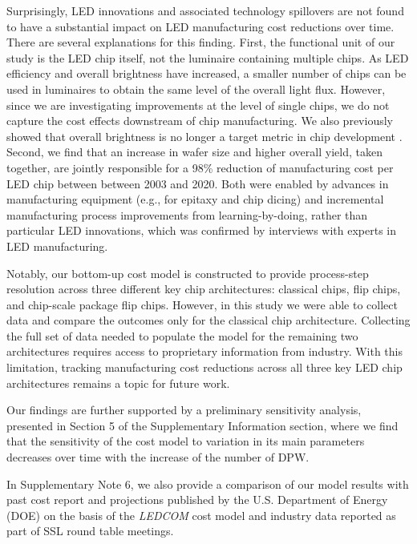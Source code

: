 \documentclass[parskip=full]{article}
\begin{document}
Surprisingly, LED innovations and associated technology spillovers are not found to have a substantial impact on LED manufacturing cost reductions over time. There are several explanations for this finding. First, the functional unit of our study is the LED chip itself, not the luminaire containing multiple chips. As LED efficiency and overall brightness have increased, a smaller number of chips can be used in luminaires to obtain the same level of the overall light flux. However, since we are investigating improvements at the level of single chips, we do not capture the cost effects downstream of chip manufacturing. We also previously showed that overall brightness is no longer a target metric in chip development \cite{weinold2021compound}. Second, we find that an increase in wafer size and higher overall yield, taken together, are jointly responsible for a 98\% reduction of manufacturing cost per LED chip between between 2003 and 2020. Both were enabled by advances in manufacturing equipment (e.g., for epitaxy and chip dicing) and incremental manufacturing process improvements from learning-by-doing, rather than particular LED innovations, which was confirmed by interviews with experts in LED manufacturing. 

Notably, our bottom-up cost model is constructed to provide process-step resolution across three different key chip architectures: classical chips, flip chips, and chip-scale package flip chips. However, in this study we were able to collect data and compare the outcomes only for the classical chip architecture. Collecting the full set of data needed to populate the model for the remaining two architectures requires access to proprietary information from industry. With this limitation, tracking manufacturing cost reductions across all three key LED chip architectures remains a topic for future work.

Our findings are further supported by a preliminary sensitivity analysis, presented in Section 5 of the Supplementary Information section, where we find that the sensitivity of the cost model to variation in its main parameters decreases over time with the increase of the number of DPW. 

In Supplementary Note 6, we also provide a comparison of our model results with past cost report and projections published by the U.S. Department of Energy (DOE) on the basis of the \textit{LEDCOM} cost model \cite{ledcomv2} and industry data reported as part of SSL round table meetings.
\end{document}
